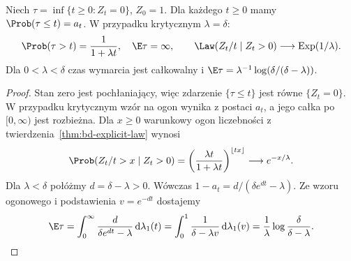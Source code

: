 \begin{wniosek}
Niech $\tau=\inf\{t\ge0:Z_t=0\}$, $Z_0=1$.
Dla każdego $t\ge0$ mamy
$\Prob(\tau\le t)=a_t$.
W przypadku krytycznym $\lambda=\delta$:
\[
\Prob(\tau>t)=\frac1{1+\lambda t},
\quad \E\tau=\infty,\qquad
\Law(Z_t/t\mid Z_t>0)\longrightarrow
\mathrm{Exp}(1/\lambda).
\]
Dla $0<\lambda<\delta$ czas wymarcia jest całkowalny
i $\E\tau=\lambda^{-1}\log(\delta/(\delta-\lambda))$.
\end{wniosek}
\begin{proof}
Stan zero jest pochłaniający, więc zdarzenie
$\{\tau\le t\}$ jest równe $\{Z_t=0\}$.
W przypadku krytycznym wzór na ogon wynika
z postaci $a_t$, a jego całka po $[0,\infty)$
jest rozbieżna. Dla $x\ge0$ warunkowy ogon
liczebności z twierdzenia~\ref{thm:bd-explicit-law}
wynosi
\[
\Prob(Z_t/t>x\mid Z_t>0)
=\left(\frac{\lambda t}{1+\lambda t}\right)^{\lfloor tx\rfloor}
\longrightarrow e^{-x/\lambda}.
\]
Dla $\lambda<\delta$ połóżmy $d=\delta-\lambda>0$.
Wówczas $1-a_t=d/(\delta e^{dt}-\lambda)$.
Ze wzoru ogonowego i podstawienia $v=e^{-dt}$
dostajemy
\[
\E\tau=\int_0^\infty\frac{d}{\delta e^{dt}-\lambda}
\,\mathrm d\lambda_1(t)
=\int_0^1\frac{1}{\delta-\lambda v}\,\mathrm d\lambda_1(v)
=\frac1\lambda\log\frac{\delta}{\delta-\lambda}.
\]
\end{proof}

